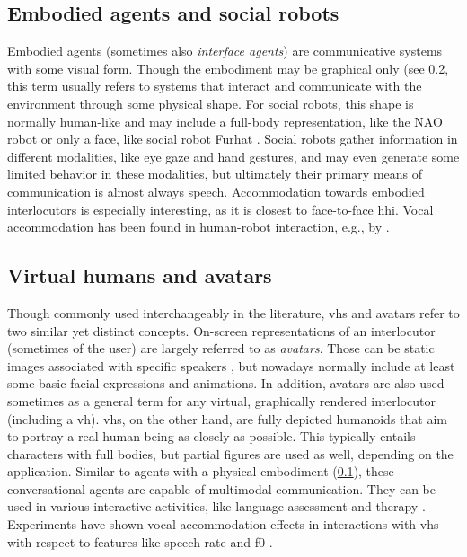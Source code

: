 \subsection{Embodied agents and social robots}
\label{subsec:embodied_agents}

Embodied agents (sometimes also \emph{interface agents}) are communicative systems with some visual form.
Though the embodiment may be graphical only (see \cref{subsec:virtual_humans}, this term usually refers to systems that interact and communicate with the environment through some physical shape.
For social robots, this shape is normally human-like and may include a full-body representation, like the NAO robot \citep{Singh2016nao} or only a face, like social robot Furhat \citep{AlMoubayed2012furhat}.
Social robots gather information in different modalities, like eye gaze and hand gestures, and may even generate some limited behavior in these modalities, but ultimately their primary means of communication is almost always speech.
Accommodation towards embodied interlocutors is especially interesting, as it is closest to face-to-face \ac{hhi}.
Vocal accommodation has been found in human-robot interaction, e.g., by \citet{Ibrahim2019fundamental}.

\subsection{Virtual humans and avatars}
\label{subsec:virtual_humans}

Though commonly used interchangeably in the literature, \acp{vh} and avatars refer to two similar yet distinct concepts.
On-screen representations of an interlocutor (sometimes of the user) are largely referred to as \emph{avatars}.
Those can be static images associated with specific speakers \citep[as in][]{Cohn2020Interspeech}, but nowadays normally include at least some basic facial expressions and animations.
In addition, avatars are also used sometimes as a general term for any virtual, graphically rendered interlocutor (including a \ac{vh}).
\Acp{vh}, on the other hand, are fully depicted humanoids that aim to portray a real human being as closely as possible.
This typically entails characters with full bodies, but partial figures are used as well, depending on the application.
Similar to agents with a physical embodiment (\cref{subsec:embodied_agents}), these conversational agents are capable of multimodal communication.
They can be used in various interactive activities, like language assessment \citep{Peterson2005learning} and therapy \citep{Devault2014simsensei}.
Experiments have shown vocal accommodation effects in interactions with \acp{vh} with respect to features like speech rate and \ac{f0} \citep{Gijssels2016speech, Staum2010virtually}.

